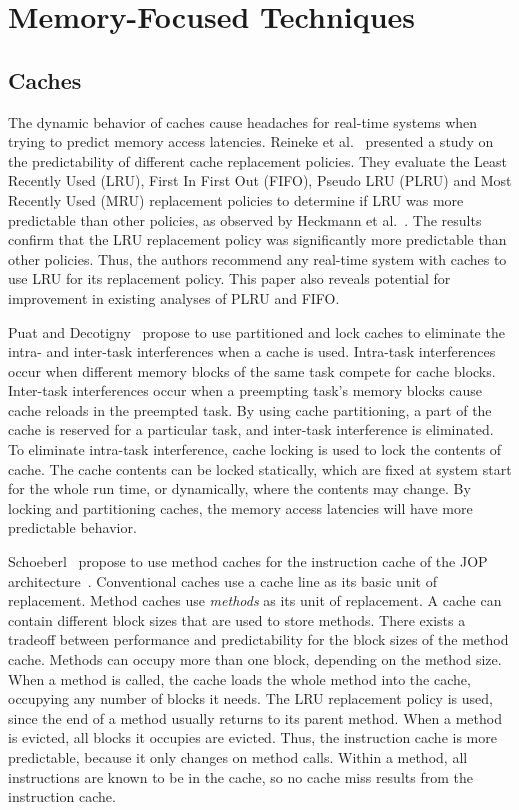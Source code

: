 \section{Memory-Focused Techniques}
\subsection{Caches}
The dynamic behavior of caches cause headaches for real-time systems when trying to predict memory access latencies.
Reineke et al.~\cite{Reineke07TimingPredictability} presented a study on the predictability of different cache replacement policies.
They evaluate the Least Recently Used (LRU), First In First Out (FIFO), Pseudo LRU (PLRU) and Most Recently Used (MRU) replacement policies to determine if LRU was more predictable than other policies, as observed by Heckmann et al.~\cite{Heckmann2003processor}.    
The results confirm that the LRU replacement policy was significantly more predictable than other policies.
Thus, the authors recommend any real-time system with caches to use LRU for its replacement policy. 
This paper also reveals potential for improvement in existing analyses of PLRU and FIFO.

Puat and Decotigny~\cite{Puaut02} propose to use partitioned and lock caches to eliminate the intra- and inter-task interferences when a cache is used. 
Intra-task interferences occur when different memory blocks of the same task compete for cache blocks.
Inter-task interferences occur when a preempting task's memory blocks cause cache reloads in the preempted task.
By using cache partitioning, a part of the cache is reserved for a particular task, and inter-task interference is eliminated.
To eliminate intra-task interference, cache locking is used to lock the contents of cache.
The cache contents can be locked statically, which are fixed at system start for the whole run time, or dynamically, where the contents may change.   
By locking and partitioning caches, the memory access latencies will have more predictable behavior. 

Schoeberl~\cite{jop:jtres_cache} propose to use method caches for the instruction cache of the JOP architecture~\cite{jop:wcet}.
Conventional caches use a cache line as its basic unit of replacement. 
Method caches use \emph{methods} as its unit of replacement. 
A cache can contain different block sizes that are used to store methods. 
There exists a tradeoff between performance and predictability for the block sizes of the method cache. 
Methods can occupy more than one block, depending on the method size. 
When a method is called, the cache loads the whole method into the cache, occupying any number of blocks it needs.
The LRU replacement policy is used, since the end of a method usually returns to its parent method. 
When a method is evicted, all blocks it occupies are evicted. 
Thus, the instruction cache is more predictable, because it only changes on method calls. 
Within a method, all instructions are known to be in the cache, so no cache miss results from the instruction cache.
 
